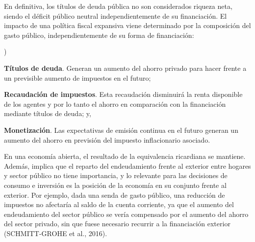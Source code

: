 \documentclass[10pt,a4paper]{article}
\newcounter{alphaitem}
\newenvironment{la}
      {\begin{list}{\alph{alphaitem})}{%
          \usecounter{alphaitem}%
          \setlength{\leftmargin}{1cm}%
          \setlength{\parskip}{3pt}%
          \setlength{\itemsep}{0pt}%
          \setlength{\parsep}{0pt}%
      }}
      {\end{list}}
\begin{document}
En definitiva, los títulos de deuda pública no son considerados riqueza neta, siendo el déficit público neutral independientemente de su financiación. El impacto de una política fiscal expansiva viene determinado por la composición del gasto público, independientemente de su forma de financiación:
\begin{la}
    \item \textbf{Títulos de deuda}. Generan un aumento del ahorro privado para hacer frente a un previsible aumento de impuestos en el futuro;
    \item \textbf{Recaudación de impuestos}. Esta recaudación disminuirá la renta disponible de los agentes y por lo tanto el ahorro en comparación con la financiación mediante títulos de deuda; y,
    \item \textbf{Monetización}. Las expectativas de emisión continua en el futuro generan un aumento del ahorro en previsión del impuesto inflacionario asociado.
\end{la}

En una economía abierta, el resultado de la equivalencia ricardiana se mantiene. Además, implica que el reparto del endeudamiento frente al exterior entre hogares y sector público no tiene importancia, y lo relevante para las decisiones de consumo e inversión es la posición de la economía en su conjunto frente al exterior. Por ejemplo, dada una senda de gasto público, una reducción de impuestos no afectaría al saldo de la cuenta corriente, ya que el aumento del endeudamiento del sector público se vería compensado por el aumento del ahorro del sector privado, sin que fuese necesario recurrir a la financiación exterior (SCHMITT-GROHE et al., 2016).
\end{document}
